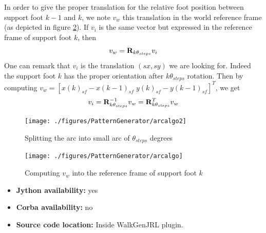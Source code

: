 \begin{itemize}
In order to give the proper translation for the relative foot position
between support foot $k-1$ and $k$, we note $v_{w}$ this translation in the
world reference frame (as depicted in figure \ref{pic:ArcAlgo}).
If $v_{i}$ is the same vector but expressed in the reference frame of support foot $k$,
then
\begin{equation*}
v_w = {\bf R}_{k \theta_{steps}} v_i
\end{equation*}
One can remark that $v_i$ is the translation $(sx,sy)$ we are looking for.
Indeed the support foot $k$ has the proper orientation after $k \theta_{steps}$ rotation.
Then by computing $v_w = [ x(k)_{sf}-x(k-1)_{sf} \; y(k)_{sf}-y(k-1)_{sf} ]^T$,
we get
\begin{equation*}
v_i = {\bf R}^{-1}_{k \theta_{steps}} v_w = {\bf R}^{T}_{k \theta_{steps}} v_w
\end{equation*}


\begin{figure}[htb]
\begin{center}
\texttt{[image: ./figures/PatternGenerator/arcalgo2]}
\caption{Splitting the arc into small arc of $\theta_{steps}$ degrees}
\label{pic:ArcAlgo2}
\end{center}
\end{figure}
\begin{figure}[htb]
\begin{center}
\texttt{[image: ./figures/PatternGenerator/arcalgo]}
\caption{Computing $v_w$ into the reference frame of support foot $k$ }
\label{pic:ArcAlgo}
\end{center}
\end{figure}

\begin{itemize}
\item \textbf{Jython availability:} yes
\item \textbf{Corba availability:} no
\item \textbf{Source code location:} Inside WalkGenJRL plugin.
\end{itemize}


\end{itemize}
